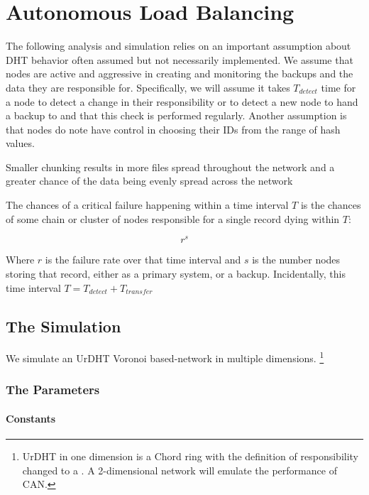 \chapter{Autonomous Load Balancing}
\label{chapter:auto-balance}



The following analysis and simulation relies on an important assumption about DHT behavior often assumed but not necessarily implemented.
We assume that nodes are active and aggressive in creating and monitoring the backups and the data they are responsible for.
Specifically, we will assume  it takes  $T_{detect}$ time for a node to detect a change in their responsibility or to detect a new node to hand a backup to and that this check is performed regularly.
Another assumption is that nodes do note have control in choosing their IDs from the range of hash values.

Smaller chunking results in more files spread throughout the  network and a greater chance of the data being evenly spread across the network 

The chances of a critical failure happening within a time interval $ T $ is the chances of some chain or cluster of nodes responsible for a single record dying within $ T $:

$$r^{s}$$

Where $ r $ is the failure rate over that time interval and $s$ is the number nodes storing that record, either as a primary system, or a backup.
Incidentally, this time interval $T = T_{detect} + T_{transfer} $


\section{The Simulation}

We simulate an UrDHT Voronoi based-network in multiple dimensions. \footnote{UrDHT in one dimension is a Chord ring with the definition of responsibility changed to a . A 2-dimensional network will emulate the performance of CAN.}



\subsection{The Parameters}

\subsubsection{Constants}


